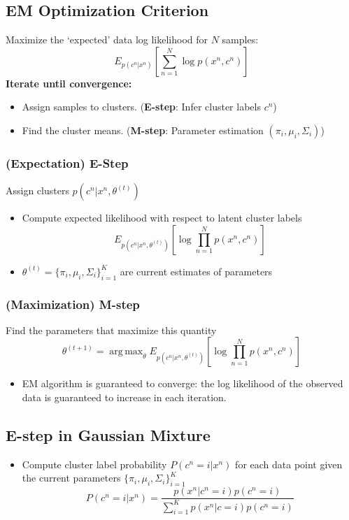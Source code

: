 \documentclass[10pt]{article}
\DeclareMathOperator*{\argmax}{arg\,max}
\begin{document}
\subsection*{EM Optimization Criterion}
Maximize the `expected' data log likelihood for $N$ samples:
\[E_{p(c^n | x^n)} \left[\sum_{n = 1}^N \log p(x^n, c^n)\right]\]
\textbf{Iterate until convergence:}
\begin{itemize}
	\item Assign samples to clusters.  (\textbf{E-step}: Infer cluster labels $c^n$)
	\item Find the cluster means.  (\textbf{M-step}: Parameter estimation $(\pi_i, \mu_i, \Sigma_i)$)
\end{itemize}

\subsubsection*{(Expectation) E-Step}
Assign clusters $p(c^n | x^n, \theta^{(t)})$
\begin{itemize}
	\item Compute expected likelihood with respect to latent cluster labels
	\[E_{p(c^n | x^n, \theta^{(t)})} \left[\log \prod_{n = 1}^N p(x^n, c^n)\right]\]
    \item $\theta^{(t)} = \{\pi_i, \mu_i, \Sigma_i\}_{i = 1}^K$ are current estimates of parameters
\end{itemize}

\subsubsection*{(Maximization) M-step}
Find the parameters that maximize this quantity
\[\theta^{(t + 1)} = \argmax_\theta E_{p(c^n | x^n, \theta^{(t)})} \left[\log \prod_{n = 1}^N p(x^n, c^n)\right]\]
\begin{itemize}
	\item EM algorithm is guaranteed to converge: the log likelihood of the observed data is guaranteed to increase in each iteration.
\end{itemize}

\subsection*{E-step in Gaussian Mixture}
\begin{itemize}
	\item Compute cluster label probability $P(c^n = i | x^n)$ for each data point given the current parameters $\{\pi_i, \mu_i, \Sigma_i\}_{i = 1}^K$
	\[P(c^n = i | x^n) = \frac{p(x^n | c^n = i) p(c^n = i)}{\sum_{i = 1}^K p(x^n | c = i) p(c^n = i)}\]
\end{itemize}
\end{document}
